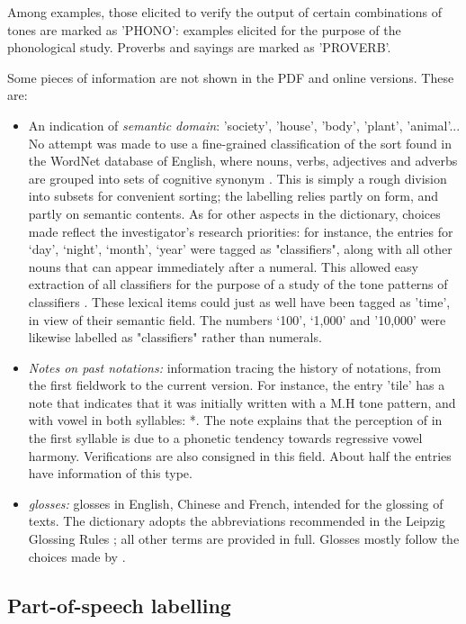 Among examples, those elicited to verify the output of certain combinations of tones are marked as 'PHONO': examples elicited for the purpose of the phonological study. Proverbs and sayings are marked as 'PROVERB'.

Some pieces of information are not shown in the PDF and online versions. These are:
\begin{itemize}
	\item An indication of \textit{semantic domain}: 'society', 'house', 'body', 'plant', 'animal'... No attempt was made to use a fine-grained classification of the sort found in the WordNet database of English, where nouns, verbs, adjectives and adverbs are grouped into sets of cognitive synonym \citep{Fellbaum 2005}. This is simply a rough division into subsets for convenient sorting; the labelling relies partly on form, and partly on semantic contents. As for other aspects in the dictionary, choices made reflect the investigator's research priorities: for instance, the entries for ‘day’, ‘night’, ‘month’, ‘year’ were tagged as "classifiers", along with all other nouns that can appear immediately after a numeral. This allowed easy extraction of all classifiers for the purpose of a study of the tone patterns of classifiers \citep{Michaud2013}. These lexical items could just as well have been tagged as 'time', in view of their semantic field. The numbers ‘100’, ‘1,000’ and ’10,000’ were likewise labelled as "classifiers" rather than numerals.
	\item \textit{Notes on past notations:} information tracing the history of notations, from the first fieldwork to the current version. For instance, the entry  'tile' has a note that indicates that it was initially written with a M.H tone pattern, and with vowel  in both syllables: *. The note explains that the perception of  in the first syllable is due to a phonetic tendency towards regressive vowel harmony. Verifications are also consigned in this field. About half the entries have information of this type.
	\item \textit{glosses:} glosses in English, Chinese and French, intended for the glossing of texts. The dictionary adopts the abbreviations recommended in the Leipzig Glossing Rules \citep{Comrie}; all other terms are provided in full. Glosses mostly follow the choices made by \citep{Lidz2010}.
\end{itemize}

	\subsection{Part-of-speech labelling} \label{sec:pos}
	
